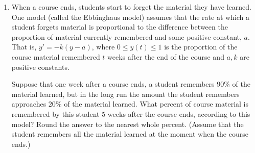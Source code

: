 \documentclass{ximera}
\begin{document}
\begin{enumerate}[label=(\arabic*)]

\item When a course ends, students start to forget the material they have learned.  One model (called the Ebbinghaus model) assumes that the rate at which a student forgets material is proportional to the difference between the proportion of material currently remembered and some positive constant, $a$.  That is, $y'=-k(y-a)$, where $0\leq y(t)\leq 1$ is the proportion of the course material remembered $t$ weeks after the end of the course and $a,k$ are positive constants.

    Suppose that one week after a course ends, a student remembers $90$\% of the material learned, but in the long run the amount the student remembers approaches $20$\% of the material learned.  What percent of course material is remembered by this student $5$ weeks after the course ends, according to this model?  Round the answer to the nearest whole percent.  (Assume that the student remembers all the material learned at the moment when the course ends.)





 
\end{enumerate}
\end{document}
